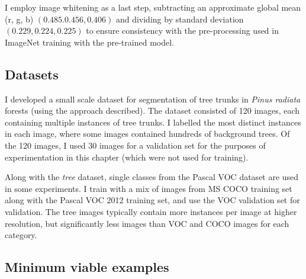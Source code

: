 I employ image whitening as a last step, subtracting an approximate global mean (r, g, b) $ (0.485. 0.456, 0.406) $ and dividing by standard deviation $ (0.229, 0.224, 0.225) $  to ensure consistency with the pre-processing used in ImageNet training with the pre-trained model.



\subsection {Datasets}




I developed a small scale dataset for segmentation of tree trunks in \emph{Pinus radiata} forests (using the approach described). The dataset consisted of 120 images, each containing multiple instances of tree trunks. I labelled the most distinct instances in each image, where some images contained hundreds of background trees. Of the 120 images, I used 30 images for a validation set for the purposes of experimentation in this chapter (which were not used for training).

Along with the \emph{tree} dataset, single classes from the Pascal VOC dataset are used in some experiments. I train with a mix of images from MS COCO \cite{Lin2014} training set along with the Pascal VOC 2012 training set, and use the VOC validation set for validation. The tree images typically contain more instances per image at higher resolution, but significantly less images than VOC and COCO images for each category.


\subsection {Minimum viable examples}

